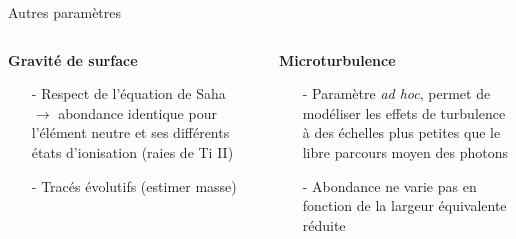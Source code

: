 \documentclass[10pt]{beamer}
\begin{document}
\begin{frame}[fragile]{Autres paramètres}
    \begin{columns}
        \begin{column}{0.48\textwidth}
            \begin{center}
                \textbf{Gravité de surface}
               \begin{itemize}
                \item [-] Respect de l'équation de Saha  $\rightarrow$ abondance identique pour l'élément neutre et ses différents états d'ionisation (raies de Ti II)
                \item [-] Tracés évolutifs (estimer masse)
               \end{itemize}
            \end{center}
        \end{column}
        \begin{column}{0.04\textwidth}
        \end{column}
        \begin{column}{0.48\textwidth}
            \begin{center}
                \textbf{Microturbulence}  
                \begin{itemize}
                    \item [-] Paramètre \textit{ad hoc}, permet de modéliser les effets de turbulence à des échelles plus petites que le libre parcours moyen des photons
                    \item [-] Abondance ne varie pas en fonction de la largeur équivalente réduite
                \end{itemize}
            \end{center}
        \end{column}

\end{columns}
\end{frame}
 
\end{document}
